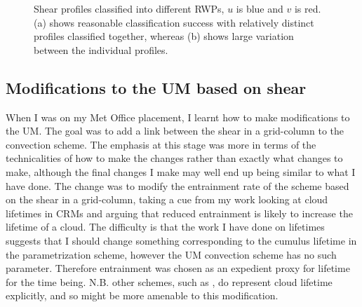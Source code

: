 \documentclass[11pt,a4paper]{article}
\begin{document}
\begin{figure}[htp!]%
    \centering
    \qquad
    \caption{Shear profiles classified into different RWPs, $u$ is blue and $v$ is red. (a) shows reasonable classification success with relatively distinct profiles classified together, whereas (b) shows large variation between the individual profiles.}%
    \label{fig:shear_profiles}%
\end{figure}


\subsection{Modifications to the UM based on shear}
\label{sec:um_mod}

When I was on my Met Office placement, I learnt how to make modifications to the UM. The goal was to add a link between the shear in a grid-column to the convection scheme. The emphasis at this stage was more in terms of the technicalities of how to make the changes rather than exactly what changes to make, although the final changes I make may well end up being similar to what I have done. The change was to modify the entrainment rate of the scheme based on the shear in a grid-column, taking a cue from my work looking at cloud lifetimes in CRMs and arguing that reduced entrainment is likely to increase the lifetime of a cloud. The difficulty is that the work I have done on lifetimes suggests that I should change something corresponding to the cumulus lifetime in the parametrization scheme, however the UM convection scheme \parencite{gregory1990mass} has no such parameter. Therefore entrainment was chosen as an expedient proxy for lifetime for the time being. N.B. other schemes, such as \cite{plant2008stochastic}, do represent cloud lifetime explicitly, and so might be more amenable to this modification. 
\end{document}

